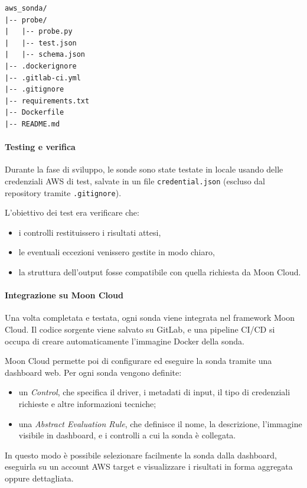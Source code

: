 \begin{lstlisting}[caption={Struttura di ogni sonda per Moon Cloud}]
aws_sonda/
|-- probe/
|   |-- probe.py
|   |-- test.json
|   |-- schema.json
|-- .dockerignore
|-- .gitlab-ci.yml
|-- .gitignore  
|-- requirements.txt
|-- Dockerfile
|-- README.md
\end{lstlisting}

\paragraph{Testing e verifica} Durante la fase di sviluppo, le sonde sono state testate in locale usando delle credenziali AWS di test, salvate in un file \texttt{credential.json} (escluso dal repository tramite \texttt{.gitignore}).

L'obiettivo dei test era verificare che:
\begin{itemize}
    \item i controlli restituissero i risultati attesi,
    \item le eventuali eccezioni venissero gestite in modo chiaro,
    \item la struttura dell'output fosse compatibile con quella richiesta da Moon Cloud.
\end{itemize}

\paragraph{Integrazione su Moon Cloud} Una volta completata e testata, ogni sonda viene integrata nel framework Moon Cloud. Il codice sorgente viene salvato su GitLab, e una pipeline CI/CD si occupa di creare automaticamente l'immagine Docker della sonda.

Moon Cloud permette poi di configurare ed eseguire la sonda tramite una dashboard web. Per ogni sonda vengono definite:
\begin{itemize}
    \item un \textit{Control}, che specifica il driver, i metadati di input, il tipo di credenziali richieste e altre informazioni tecniche;
    \item una \textit{Abstract Evaluation Rule}, che definisce il nome, la descrizione, l'immagine visibile in dashboard, e i controlli a cui la sonda è collegata.
\end{itemize}

In questo modo è possibile selezionare facilmente la sonda dalla dashboard, eseguirla su un account AWS target e visualizzare i risultati in forma aggregata oppure dettagliata.

